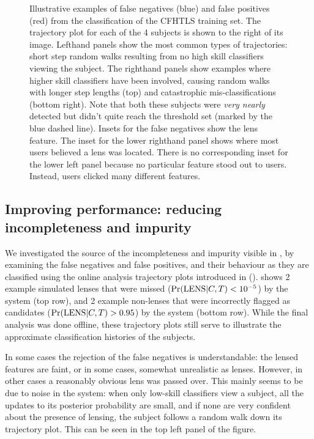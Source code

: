 \documentclass[useAMS,usenatbib,a4paper]{mn2e}
\begin{document}
\begin{figure}
\begin{minipage}{\linewidth}
\begin{minipage}[t]{0.47\linewidth}
\begin{minipage}{0.50\linewidth}
    \end{minipage}
  \end{minipage}
\end{minipage}
\caption{Illustrative examples of
false negatives (blue) and false positives (red) from the classification of
the \SW CFHTLS training set. The trajectory plot for each of the 4 subjects is
shown to the right of its image. Lefthand panels show the most common types of
trajectories: short step random walks resulting from no high skill classifiers
viewing the subject. The righthand panels show examples where higher skill
classifiers have been involved, causing random walks with longer step lengths
(top) and catastrophic mis-classifications (bottom right). Note that both these
subjects were {\it very nearly} detected but didn't quite reach the threshold
set (marked by the blue dashed line). Insets for the false
negatives show the lens feature. The inset for the lower righthand panel shows
where most users believed a lens was located. There is no corresponding inset
for the lower left panel because no particular feature stood out to users.
Instead, users clicked many different features.}
\label{fig:discuss:performance:trajectories}
\end{figure}

\subsection{Improving performance: reducing incompleteness and impurity}
\label{sec:discuss:performance}

We investigated the source of the incompleteness and impurity visible in
, by examining the \StageTwo false negatives and
false positives, and their behaviour as they are classified using the online
analysis trajectory plots introduced in 
().
 shows 2 example simulated lenses
that were missed (${\rm Pr}({\rm LENS}|C,T) < 10^{-5}$) by the \SW system (top row),
and 2 example
non-lenses that were incorrectly flagged as candidates (${\rm Pr}({\rm LENS}|C,T) >
0.95$) by the \SW system (bottom row).
While the final \StageTwo analysis was done offline,
these trajectory plots still serve to illustrate the approximate
classification histories of the subjects.

In some cases the rejection of the false negatives is understandable: the
lensed features are faint, or in some cases, somewhat unrealistic as lenses.
However, in other cases a reasonably obvious lens was passed over.  This
mainly seems to be due to noise in the system: when only low-skill classifiers
view a subject, all the updates to its posterior probability are small, and if
none are very confident about the presence of lensing, the subject follows a
random walk down its trajectory plot. This can be seen in the top left panel
of the figure.
\end{document}
